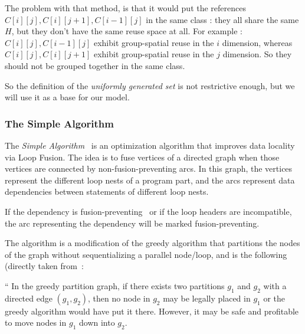 \documentclass[paper=a4, fontsize=11.5pt]{scrartcl}
\numberwithin{equation}{section}        %
\numberwithin{figure}{section}          %
\numberwithin{table}{section}               %
\begin{document}
            The problem with that method, is that it would put the references
            $C[i][j],C[i][j+1],C[i-1][j]$ in the same class : they all share the
            same $H$, but they don't have the same reuse space at all.
            For example : $C[i][j],C[i-1][j]$ exhibit group-spatial reuse in the $i$ dimension,
            whereas $C[i][j],C[i][j+1]$ exhibit group-spatial reuse in the $j$ dimension. So they
            should not be grouped together in the same class.
            \medskip

            So the definition of the \textit{uniformly generated set} is not restrictive enough,
            but we will use it as a base for our model.



        \subsubsection{The Simple Algorithm}
            The \textit{Simple Algorithm}~\cite{Kennedy94maximizingloop} is an
            optimization algorithm that improves data locality via Loop Fusion.
            The idea is to fuse vertices of a directed graph when those vertices
            are connected by non-fusion-preventing arcs.
            In this graph, the vertices represent the different loop nests of a program part,
            and the arcs represent data dependencies between statements of different loop nests.

            If the dependency is fusion-preventing~\cite{Bacon:1994:CTH:197405.197406} or if the loop headers are incompatible,
            the arc representing the dependency will be marked fusion-preventing.

            The algorithm is a modification of the greedy algorithm that partitions
            the nodes of the graph without sequentializing a parallel node/loop, and
            is the following (directly taken from~\cite{Kennedy94maximizingloop}:
            \medskip

            ``  In the greedy partition graph, if there exists two partitions $g_1$
                and $g_2$ with a directed edge $(g_1,g_2)$, then no node in $g_2$
                may be legally placed in $g_1$ or the greedy algorithm would have put it
                there. However, it may be safe and profitable to move nodes in $g_1$
                down into $g_2$.
\end{document}
